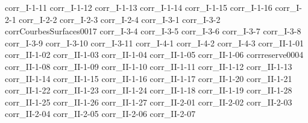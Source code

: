 {corr_I-1-11}
{corr_I-1-12}
{corr_I-1-13}
{corr_I-1-14}
{corr_I-1-15}
{corr_I-1-16}
{corr_I-2-1}
{corr_I-2-2}
{corr_I-2-3}
{corr_I-2-4}
{corr_I-3-1}
{corr_I-3-2}
{corrCourbesSurfaces0017}
{corr_I-3-4}
{corr_I-3-5}
{corr_I-3-6}
{corr_I-3-7}
{corr_I-3-8}
{corr_I-3-9}
{corr_I-3-10}
{corr_I-3-11}
{corr_I-4-1}
{corr_I-4-2}
{corr_I-4-3}
{corr_II-1-01}
{corr_II-1-02}
{corr_II-1-03}
{corr_II-1-04}
{corr_II-1-05}
{corr_II-1-06}
{corrreserve0004}
{corr_II-1-08}
{corr_II-1-09}
{corr_II-1-10}
{corr_II-1-11}
{corr_II-1-12}
{corr_II-1-13}
{corr_II-1-14}
{corr_II-1-15}
{corr_II-1-16}
{corr_II-1-17}
{corr_II-1-20}
{corr_II-1-21}
{corr_II-1-22}
{corr_II-1-23}
{corr_II-1-24}
{corr_II-1-18}
{corr_II-1-19}
{corr_II-1-28}
{corr_II-1-25}
{corr_II-1-26}
{corr_II-1-27}
{corr_II-2-01}
{corr_II-2-02}
{corr_II-2-03}
{corr_II-2-04}
{corr_II-2-05}
{corr_II-2-06}
{corr_II-2-07}
